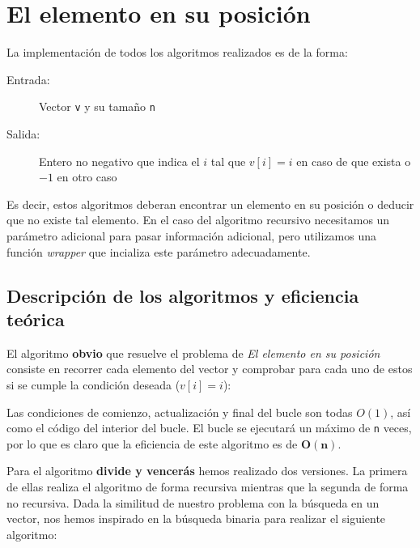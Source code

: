 \section{El elemento en su posición}

La implementación de todos los algoritmos realizados es de la forma:
\begin{description}
 \item[Entrada:] Vector \texttt{v} y su tamaño \texttt{n}
 \item[Salida:] Entero no negativo que indica el $i$ tal que $v[i]=i$ en caso de que exista o $-1$ en otro caso
\end{description}

Es decir, estos algoritmos deberan encontrar un elemento en su posición o deducir que no existe tal elemento. En el caso del algoritmo recursivo necesitamos un parámetro adicional para pasar información adicional, pero utilizamos una función \textit{wrapper} que incializa este parámetro adecuadamente.

\subsection{Descripción de los algoritmos y eficiencia teórica}

El algoritmo \textbf{obvio} que resuelve el problema de \textit{El elemento en su posición} consiste
en recorrer cada elemento del vector y comprobar para cada uno de estos si se cumple la
condición deseada ($v[i] = i$):



Las condiciones de comienzo, actualización y final del bucle son todas $O(1)$, así como el código del interior del bucle. El bucle se ejecutará un máximo de \texttt{n} veces, por lo que es claro que la eficiencia de este algoritmo es de $\mathbf{O(n)}$.

\vspace*{1cm}
\hrulefill
\vspace*{1cm}

Para el algoritmo \textbf{divide y vencerás} hemos realizado dos versiones. La primera de ellas realiza el algoritmo de forma recursiva mientras que la segunda de forma no recursiva. Dada la similitud de nuestro problema con la búsqueda en un vector, nos hemos inspirado en la búsqueda binaria para realizar el siguiente algoritmo:



